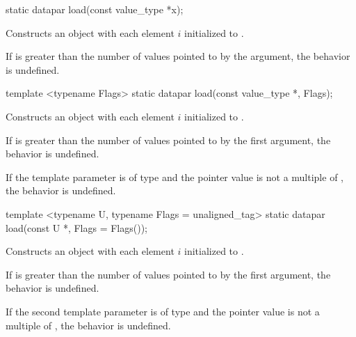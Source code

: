 \begin{wgText}
  \begin{itemdecl}
    static datapar load(const value_type *x);
  \end{itemdecl}
  \begin{itemdescr}
    \pnum
    \effects
    Constructs an object with each element $i$ initialized to .

    \pnum
    If \datapar{} is greater than the number of values pointed to by the argument, the behavior is undefined.
  \end{itemdescr}

  \begin{itemdecl}
    template <typename Flags> static datapar load(const value_type *, Flags);
  \end{itemdecl}
  \begin{itemdescr}
    \pnum
    \effects
    Constructs an object with each element $i$ initialized to .

    \pnum
    If \datapar{} is greater than the number of values pointed to by the first argument, the behavior is undefined.

    \pnum
    If the template parameter is of type  and the pointer value is not a multiple of , the behavior is undefined.
  \end{itemdescr}

  \begin{itemdecl}
    template <typename U, typename Flags = unaligned_tag> static datapar load(const U *, Flags = Flags());
  \end{itemdecl}
  \begin{itemdescr}
    \pnum
    \effects
    Constructs an object with each element $i$ initialized to .

    \pnum
    If \datapar{} is greater than the number of values pointed to by the first argument, the behavior is undefined.

    \pnum
    If the second template parameter is of type  and the pointer value is not a multiple of , the behavior is undefined.
  \end{itemdescr}

  \begin{itemdecl}
  \end{itemdecl}
  \begin{itemdescr}
  \end{itemdescr}

  

\end{wgText}

